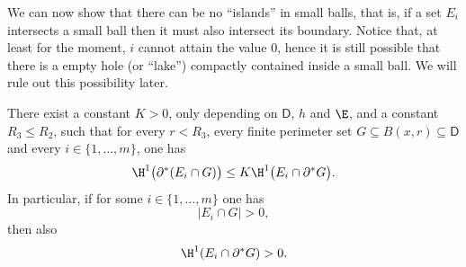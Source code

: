 We can now show that there can be no ``islands'' in small balls, that is, if a set $E_i$ intersects a small ball then it must also intersect its boundary. Notice that, at least for the moment, $i$ cannot attain the value $0$, hence it is still possible that there is a empty hole (or ``lake'') compactly contained inside a small ball. We will rule out this possibility later.

\begin{lem}[No-islands]\label{noisland}
There exist a constant $K>0$, only depending on $\mathsf{D}$, $h$ and $\E$, and a constant $R_3\leq R_2$, such that for every $r< R_3$, every finite perimeter set $G\subseteq B(x,r)\subseteq \mathsf{D}$ and every $i\in\{1,\dots,m\}$, one has
\begin{equation}\label{effnoisl}
\H^1\big(\partial^* (E_i \cap G)\big) \leq K \H^1\big(E_i \cap \partial^* G\big).
\end{equation}
In particular, if for some $i\in\{1,\dots,m\}$ one has
\begin{equation}\label{intint}
|E_i \cap G|>0,
\end{equation}
then also
\begin{equation}\label{intbor}
\H^1(E_i \cap \partial^* G)>0.
\end{equation}
\end{lem}
